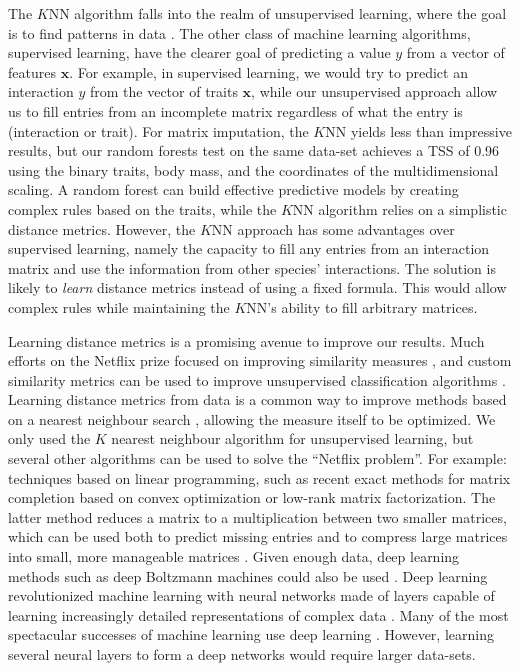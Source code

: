 \documentclass[letterpaper]{article}
\begin{document}
The $K$NN algorithm falls into the realm of unsupervised learning, where the
goal is to find patterns in data \cite{mur12}. The other class of machine
learning algorithms, supervised learning, have the clearer goal of predicting a
value $y$ from a vector of features $\mathbf{x}$. For example, in supervised
learning, we would try to predict an interaction $y$ from the vector of traits
$\mathbf{x}$, while our unsupervised approach allow us to fill entries from an
incomplete matrix regardless of what the entry is (interaction or trait). For
matrix imputation, the $K$NN yields less than impressive results, but our
random forests test on the same data-set achieves a TSS of 0.96 using the
binary traits, body mass, and the coordinates of the multidimensional
scaling. A random forest can build effective predictive models by creating
complex rules based on the traits, while the $K$NN algorithm relies on a
simplistic distance metrics. However, the $K$NN approach has some advantages
over supervised learning, namely the capacity to fill any entries from an
interaction matrix and use the information from other species' interactions. The
solution is likely to \emph{learn} distance metrics \cite{bel15} instead of
using a fixed formula. This would allow complex rules while maintaining the
$K$NN's ability to fill arbitrary matrices.

Learning distance metrics is a promising avenue to improve our results. Much
efforts on the Netflix prize focused on improving similarity measures
\cite{tos08,hon06}, and custom similarity metrics can be used to improve
unsupervised classification algorithms \cite{bel15}. Learning distance metrics
from data is a common way to improve methods based on a nearest neighbour
search \cite{xin03,bel15}, allowing the measure itself to be optimized. We only
used the $K$ nearest neighbour algorithm for unsupervised learning, but several
other algorithms can be used to solve the ``Netflix problem''.  For example:
techniques based on linear programming, such as recent exact methods for matrix
completion based on convex optimization \cite{can09} or low-rank matrix
factorization. The latter method reduces a matrix to a multiplication between
two smaller matrices, which can be used both to predict missing entries and to
compress large matrices into small, more manageable matrices \cite{van13}.
Given enough data, deep learning methods such as deep Boltzmann machines could
also be used \cite{zha11}. Deep learning revolutionized machine learning with
neural networks made of layers capable of learning increasingly detailed
representations of complex data \cite{hin06}. Many of the most spectacular
successes of machine learning use deep learning \cite{mni13}. However, learning
several neural layers to form a deep networks would require larger data-sets.
\end{document}
